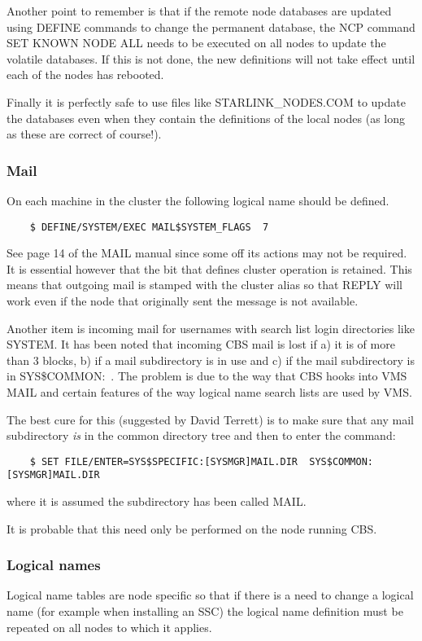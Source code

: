 \begin {itemize}
Another point to remember is that if the remote node databases are updated
using DEFINE commands to change the permanent database, the NCP command
SET KNOWN NODE ALL needs to be executed on all nodes to update the volatile
databases.
If this is not done, the new definitions will not take effect until each of
the nodes has rebooted.

Finally it is perfectly safe to use files like STARLINK\_NODES.COM to update
the databases even when they contain the definitions of the local nodes 
(as long as these are correct of course!).

\end {itemize}

\subsubsection {Mail}
On each machine in the cluster the following logical name should be defined.
\begin{verbatim}
    $ DEFINE/SYSTEM/EXEC MAIL$SYSTEM_FLAGS  7
\end{verbatim}
See page 14 of the MAIL manual since some off its actions may not be required.
It is essential however that the bit that defines cluster operation is retained.
This means that outgoing mail is stamped with the cluster alias so that REPLY
will work even if the node that originally sent the message is not available.

Another item is incoming mail for usernames with search list login directories
like SYSTEM.
It has been noted that incoming CBS mail is lost if a) it is of more than 3
blocks,  b) if a mail subdirectory is in use and c) if the mail subdirectory
is in SYS\$COMMON:~.
The problem is due to the way that CBS hooks into VMS MAIL and certain features
of the way logical name search lists are used by VMS.

The best cure for this (suggested by David Terrett) is to make sure that
any mail subdirectory {\em is} in the common directory tree and then to
enter the command:
\begin{verbatim}
    $ SET FILE/ENTER=SYS$SPECIFIC:[SYSMGR]MAIL.DIR  SYS$COMMON:[SYSMGR]MAIL.DIR
\end{verbatim}
where it is assumed the subdirectory has been called MAIL.

It is probable that this need only be performed on the node running CBS.

\subsubsection {Logical names}
Logical name tables are node specific so that if there is a need to change a
logical name (for example when installing an SSC) the logical name definition
must be repeated on all nodes to which it applies.

